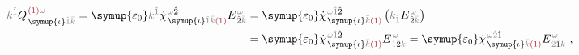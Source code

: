 \begin{subequations}
\begin{align}
	\mathcolor{gray}{k^{\hat{1}}} Q^{\;\! \textcolor{Maroon}{(1)} \mathcolor{gray}{\omega}}_{\;\! \symup{\iota} \mathcolor{gray}{\hat{1}} \mathcolor{gray}{\bar{k}}} = {\symup{\varepsilon_0}} \mathcolor{gray}{k^{\hat{1}}} \dot{\chi}^{\;\! \mathcolor{gray}{\omega} \hat{2}}_{\;\! \symup{\iota} \mathcolor{gray}{\hat{1}} \mathcolor{gray}{\bar{k}} \textcolor{Maroon}{(1)}} E^{\;\!\mathcolor{gray}{\omega}}_{\;\! \hat{2} \mathcolor{gray}{\bar{k}}} &= {\symup{\varepsilon_0}} \dot{\chi}^{\;\! \mathcolor{gray}{\omega} \mathcolor{gray}{\hat{1}} \hat{2} }_{\;\! \symup{\iota} \mathcolor{gray}{\bar{k}} \textcolor{Maroon}{(1)}} \left( \mathcolor{gray}{k_{\hat{1}}} E^{\;\!\mathcolor{gray}{\omega}}_{\;\! \hat{2} \mathcolor{gray}{\bar{k}}} \right) \label{eq:div-Q(1)_wk} \\ &= {\symup{\varepsilon_0}} \dot{\chi}^{\;\! \mathcolor{gray}{\omega} \mathcolor{gray}{\hat{1}} \hat{2} }_{\;\! \symup{\iota} \mathcolor{gray}{\bar{k}} \textcolor{Maroon}{(1)}} E^{\;\!\mathcolor{gray}{\omega}}_{\;\! \mathcolor{gray}{\hat{1}} \hat{2} \mathcolor{gray}{\bar{k}}} = {\symup{\varepsilon_0}} \dot{\chi}^{\;\! \mathcolor{gray}{\omega} \mathcolor{gray}{\hat{2}} \hat{1} }_{\;\! \symup{\iota} \mathcolor{gray}{\bar{k}} \textcolor{Maroon}{(1)}} E^{\;\!\mathcolor{gray}{\omega}}_{\;\! \mathcolor{gray}{\hat{2}} \hat{1} \mathcolor{gray}{\bar{k}}} \label{eq:div-Q(1)_wk-b}~,
\end{align}
\end{subequations}
